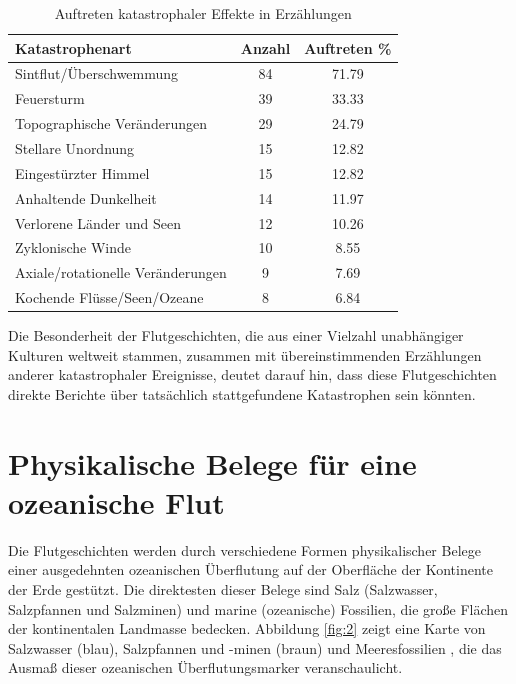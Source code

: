 \documentclass[10pt,twocolumn,letterpaper]{article}
\begin{document}
\begin{table}[ht]
\begin{center}
\renewcommand{\arraystretch}{1.2}  %
\begin{tabular}{|l|c|c|}
\hline
\textbf{Katastrophenart} & \textbf{Anzahl} & \textbf{Auftreten \%} \\
\hline\hline
Sintflut/Überschwemmung  & 84 & 71.79 \\
Feuersturm               & 39 & 33.33 \\
Topographische Veränderungen & 29 & 24.79 \\
Stellare Unordnung         & 15 & 12.82 \\
Eingestürzter Himmel       & 15 & 12.82 \\
Anhaltende Dunkelheit      & 14 & 11.97 \\

Verlorene Länder und Seen   & 12 & 10.26 \\
Zyklonische Winde          & 10 & 8.55  \\
Axiale/rotationelle Veränderungen & 9 & 7.69  \\
Kochende Flüsse/Seen/Ozeane & 8 & 6.84 \\
\hline
\end{tabular}
\end{center}
\caption{Auftreten katastrophaler Effekte in Erzählungen}
\label{tab: 1}
\end{table}

Die Besonderheit der Flutgeschichten, die aus einer Vielzahl unabhängiger Kulturen weltweit stammen, zusammen mit übereinstimmenden Erzählungen anderer katastrophaler Ereignisse, deutet darauf hin, dass diese Flutgeschichten direkte Berichte über tatsächlich stattgefundene Katastrophen sein könnten.

\section{Physikalische Belege für eine ozeanische Flut}

Die Flutgeschichten werden durch verschiedene Formen physikalischer Belege einer ausgedehnten ozeanischen Überflutung auf der Oberfläche der Kontinente der Erde gestützt. Die direktesten dieser Belege sind Salz (Salzwasser, Salzpfannen und Salzminen) und marine (ozeanische) Fossilien, die große Flächen der kontinentalen Landmasse bedecken. Abbildung \ref{fig:2} zeigt eine Karte von Salzwasser (blau), Salzpfannen und -minen (braun) und Meeresfossilien \cite{15,16,86,87}, die das Ausmaß dieser ozeanischen Überflutungsmarker veranschaulicht.
\end{document}
